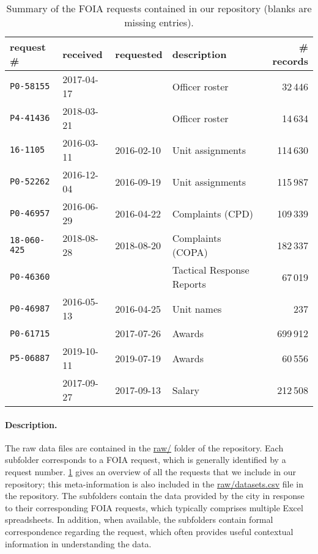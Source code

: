 \begin{table}[h]
	\begin{center}
\begin{tabular}{@{}llllr@{}}
	\toprule
	request \#&received&requested&description& \# records\\
\midrule
	\texttt{P0-58155}&2017-04-17& &Officer roster& 32\,446\\
	\texttt{P4-41436}&2018-03-21& &Officer roster& 14\,634\\
	\texttt{16-1105}&2016-03-11&2016-02-10&Unit assignments&114\,630\\
	\texttt{P0-52262}&2016-12-04&2016-09-19&Unit assignments&115\,987\\
	\texttt{P0-46957}&2016-06-29&2016-04-22&Complaints (CPD)&109\,339\\
	\texttt{18-060-425}&2018-08-28&2018-08-20&Complaints (COPA)&182\,337\\
	\texttt{P0-46360}& & &Tactical Response Reports&67\,019\\
	\texttt{P0-46987}&2016-05-13&2016-04-25&Unit names&237\\
	\texttt{P0-61715}& &2017-07-26&Awards&699\,912\\
	\texttt{P5-06887}&2019-10-11&2019-07-19&Awards&60\,556\\
					 &2017-09-27&2017-09-13&Salary&212\,508\\
\bottomrule
\end{tabular}
\vspace{0.7em}
\caption{Summary of the FOIA requests contained in our repository (blanks are missing entries).}
\label{table:summary}
\end{center}
\end{table}

\paragraph{Description.}
The raw data files are contained in the \url{raw/} folder of the
repository. Each subfolder corresponds to a FOIA request, which is
generally identified by a request number. \cref{table:summary} gives
an overview of all the requests that we include in
our repository; this meta-information is also included in the \url{raw/datasets.csv}
file in the repository. The subfolders contain the data provided by the city
in response to their corresponding FOIA requests, which typically comprises multiple
Excel spreadsheets. In addition, when available, the subfolders contain formal correspondence 
regarding the request, which often provides useful contextual information in understanding the data.  

